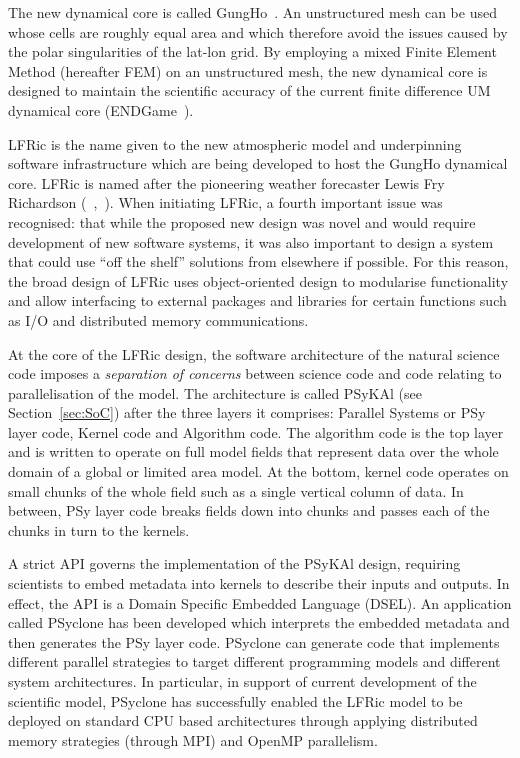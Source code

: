 \documentclass[review,times]{elsarticle}
\begin{document}
The new dynamical core is called GungHo~\cite{melvin2018}. An
unstructured mesh can be used whose cells are roughly equal area and which
therefore avoid the issues caused by the polar singularities of the
lat-lon grid. By employing a mixed Finite Element Method (hereafter
FEM) on an unstructured mesh, the new dynamical core is designed to
maintain the scientific accuracy of the current finite difference UM
dynamical core (ENDGame~\cite{QJ:QJ2235}).

LFRic is the name given to the new atmospheric model and underpinning
software infrastructure which are being developed to host the GungHo
dynamical core. LFRic is named after the pioneering weather forecaster
Lewis Fry Richardson (~\cite{Lynch2006},~\cite{ForecastFactory}).
When initiating LFRic, a fourth important issue was recognised: that
while the proposed new design was novel and would require development
of new software systems, it was also important to design a system that
could use ``off the shelf'' solutions from elsewhere if possible. For
this reason, the broad design of LFRic uses object-oriented design to
modularise functionality and allow interfacing to external packages and
libraries for certain functions such as I/O and distributed memory
communications.

At the core of the LFRic design, the software architecture of the
natural science code imposes a {\em separation of concerns} between
science code and code relating to parallelisation of the model. The
architecture is called PSyKAl (see Section~\ref{sec:SoC}) after the
three layers it comprises: Parallel Systems or PSy layer code, Kernel
code and Algorithm code. The algorithm code is the top layer and is
written to operate on full model fields that represent data over the
whole domain of a global or limited area model. At the bottom, kernel
code operates on small chunks of the whole field such as a single
vertical column of data. In between, PSy layer code breaks fields down
into chunks and passes each of the chunks in turn to the kernels.

A strict API governs the implementation of the PSyKAl design,
requiring scientists to embed metadata into kernels to describe their
inputs and outputs. In effect, the API is a Domain Specific Embedded
Language (DSEL). An application called PSyclone has been developed
which interprets the embedded metadata and then generates the PSy
layer code. PSyclone can generate code that implements different
parallel strategies to target different programming models and
different system architectures. In particular, in support of current
development of the scientific model, PSyclone has successfully enabled
the LFRic model to be deployed on standard CPU based architectures through
applying distributed memory strategies (through MPI) and OpenMP parallelism.
\end{document}
